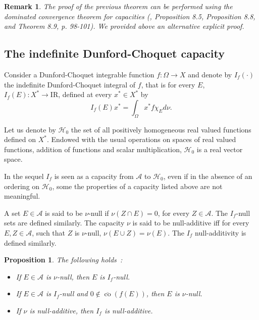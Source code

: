 \documentclass[preprint,authoryear,12pt]{article}%
\newtheorem{proposition}{Proposition}
\newtheorem{remark}{Remark}
\theoremstyle{definition}
\renewcommand{\AA}{{\mathcal A}}
\newcommand{\IR}{{\mathrm{I\!R}}}
\newcommand{\HH}{{\mathcal H}}
\newcommand{\cob}{\overline{\mathop{\mathrm{co}}}}
\begin{document}
\begin{remark}
 The proof of the previous theorem can be performed using the dominated convergence theorem for capacities (\citet{DEN94}, Proposition 8.5, Proposition 8.8, and Theorem 8.9, p. 98-101). We provided above an alternative explicit proof. 
\end{remark}
\subsection{The indefinite Dunford-Choquet capacity}
Consider a Dunford-Choquet integrable function $f:\Omega\rightarrow X$ and denote by $I_f(\cdot)$ the indefinite Dunford-Choquet integral of $f$, that is for every $E$, $I_f(E) : X^*\rightarrow \IR$, defined at every $x^*\in X^*$ by $$I_f(E)x^*=\int_\Omega x^*f \chi_E d\nu.$$
 
Let us denote by $\HH_0$ the set of all positively homogeneous real valued functions defined on $X^*$. Endowed with the usual operations on spaces of real valued functions, addition of functions and scalar multiplication, $\HH_0$ is a real vector space. 

In the sequel $I_f$ is seen as a capacity from $\AA$ to $\HH_0$, even if in the absence of an ordering on $\HH_0$, some the properties of a capacity listed above are not meaningful.

A set $E\in \AA$ is said to be $\nu$-null if $\nu(Z\cap E)=0$, for every $Z\in \AA$. The $I_f$-null sets are defined similarly. The capacity $\nu$ is said to be null-additive iff for every $E,Z\in \AA$, such that $Z$ is $\nu$-null, $\nu(E\cup Z)=\nu(E)$. The $I_f$ null-additivity is defined similarly. 

\begin{proposition} The following holds~:
\begin{itemize}
\item[1)]If $E\in \AA$ is $\nu$-null, then $E$ is $I_f$-null. 
\item[2)]If $E\in \AA$ is $I_f$-null and $0\notin \cob(f(E))$, then $E$ is $\nu$-null.
\item[3)]If $\nu$ is null-additive, then $I_f$ is null-additive. 

\end{itemize}
\end{proposition}
\end{document}
